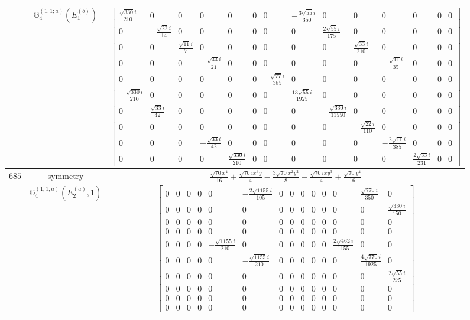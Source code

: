 \documentclass[fleqn,8pt,landscape]{jsarticle}
\begin{document}
\begin{longtable}{ccc}
$  $ & $ \mathbb{G}_{4}^{(1,1;a)}(E_{1}^{(b)}) $ & $ \begin{bmatrix} \frac{\sqrt{330} i}{210} & 0 & 0 & 0 & 0 & 0 & 0 & - \frac{3 \sqrt{55} i}{350} & 0 & 0 & 0 & 0 & 0 & 0 \\ 0 & - \frac{\sqrt{22} i}{14} & 0 & 0 & 0 & 0 & 0 & 0 & \frac{2 \sqrt{55} i}{175} & 0 & 0 & 0 & 0 & 0 \\ 0 & 0 & \frac{\sqrt{11} i}{7} & 0 & 0 & 0 & 0 & 0 & 0 & \frac{\sqrt{33} i}{210} & 0 & 0 & 0 & 0 \\ 0 & 0 & 0 & - \frac{\sqrt{33} i}{21} & 0 & 0 & 0 & 0 & 0 & 0 & - \frac{\sqrt{11} i}{35} & 0 & 0 & 0 \\ 0 & 0 & 0 & 0 & 0 & 0 & - \frac{\sqrt{77} i}{385} & 0 & 0 & 0 & 0 & 0 & 0 & 0 \\ - \frac{\sqrt{330} i}{210} & 0 & 0 & 0 & 0 & 0 & 0 & \frac{13 \sqrt{55} i}{1925} & 0 & 0 & 0 & 0 & 0 & 0 \\ 0 & \frac{\sqrt{33} i}{42} & 0 & 0 & 0 & 0 & 0 & 0 & - \frac{\sqrt{330} i}{11550} & 0 & 0 & 0 & 0 & 0 \\ 0 & 0 & 0 & 0 & 0 & 0 & 0 & 0 & 0 & - \frac{\sqrt{22} i}{110} & 0 & 0 & 0 & 0 \\ 0 & 0 & 0 & - \frac{\sqrt{33} i}{42} & 0 & 0 & 0 & 0 & 0 & 0 & - \frac{2 \sqrt{11} i}{385} & 0 & 0 & 0 \\ 0 & 0 & 0 & 0 & \frac{\sqrt{330} i}{210} & 0 & 0 & 0 & 0 & 0 & 0 & \frac{2 \sqrt{33} i}{231} & 0 & 0 \end{bmatrix} $ \\ \hline
$ 685 $ & $ \text{symmetry} $ & $ \frac{\sqrt{70} x^{4}}{16} + \frac{\sqrt{70} i x^{3} y}{4} - \frac{3 \sqrt{70} x^{2} y^{2}}{8} - \frac{\sqrt{70} i x y^{3}}{4} + \frac{\sqrt{70} y^{4}}{16} $ \\
$  $ & $ \mathbb{G}_{4}^{(1,1;a)}(E_{2}^{(a)},1) $ & $ \begin{bmatrix} 0 & 0 & 0 & 0 & 0 & - \frac{2 \sqrt{1155} i}{105} & 0 & 0 & 0 & 0 & 0 & 0 & \frac{\sqrt{770} i}{350} & 0 \\ 0 & 0 & 0 & 0 & 0 & 0 & 0 & 0 & 0 & 0 & 0 & 0 & 0 & \frac{\sqrt{330} i}{150} \\ 0 & 0 & 0 & 0 & 0 & 0 & 0 & 0 & 0 & 0 & 0 & 0 & 0 & 0 \\ 0 & 0 & 0 & 0 & 0 & 0 & 0 & 0 & 0 & 0 & 0 & 0 & 0 & 0 \\ 0 & 0 & 0 & 0 & - \frac{\sqrt{1155} i}{210} & 0 & 0 & 0 & 0 & 0 & 0 & \frac{2 \sqrt{462} i}{1155} & 0 & 0 \\ 0 & 0 & 0 & 0 & 0 & - \frac{\sqrt{1155} i}{210} & 0 & 0 & 0 & 0 & 0 & 0 & \frac{4 \sqrt{770} i}{1925} & 0 \\ 0 & 0 & 0 & 0 & 0 & 0 & 0 & 0 & 0 & 0 & 0 & 0 & 0 & \frac{2 \sqrt{55} i}{275} \\ 0 & 0 & 0 & 0 & 0 & 0 & 0 & 0 & 0 & 0 & 0 & 0 & 0 & 0 \\ 0 & 0 & 0 & 0 & 0 & 0 & 0 & 0 & 0 & 0 & 0 & 0 & 0 & 0 \\ 0 & 0 & 0 & 0 & 0 & 0 & 0 & 0 & 0 & 0 & 0 & 0 & 0 & 0 \end{bmatrix} $ \\ \hline

\end{longtable}
\end{document}

